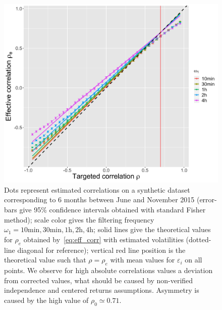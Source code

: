 \documentclass{bmcart}
\begin{document}
\begin{figure}[h!]
\centering
\includegraphics[width=\linewidth]{figures/Fig4.png}
\caption{ Dots represent estimated correlations on a synthetic dataset corresponding to 6 months between June and November 2015 (error-bars give 95\% confidence intervals obtained with standard Fisher method); scale color gives the filtering frequency $\omega_1=10\textrm{min},30\textrm{min},1\textrm{h},2\textrm{h},4\textrm{h}$; solid lines give the theoretical values for $\rho_e$ obtained by~\ref{eq:eff_corr} with estimated volatilities (dotted-line diagonal for reference); vertical red line position is the theoretical value such that $\rho = \rho_e$ with mean values for $\varepsilon_i$ on all points. We observe for high absolute correlations values a deviation from corrected values, what should be caused by non-verified independence and centered returns assumptions. Asymmetry is caused by the high value of $\rho_0 \simeq 0.71$.}
\label{fig:effective_corrs}
\end{figure}
\end{document}
